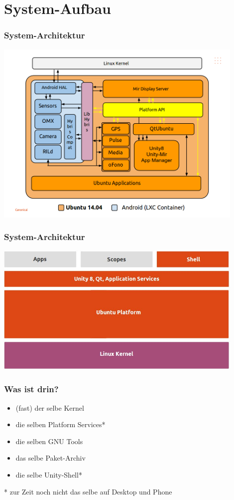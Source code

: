 \documentclass{beamer}
\begin{document}
\section{System-Aufbau}

\frame{\sectionpage}

\begin{frame}
  \frametitle{System-Architektur}
  \includegraphics[width=0.9\textwidth]{images/ubuntu_touch_architecture}
\end{frame}

\begin{frame}
  \frametitle{System-Architektur}
  \includegraphics[width=0.9\textwidth]{images/system-arch2}
\end{frame}

\begin{frame}
  \frametitle{Was ist drin?}
  \begin{itemize}
    \item (fast) der selbe Kernel
    \item die selben Platform Services*
    \item die selben GNU Tools
    \item das selbe Paket-Archiv
    \item die selbe Unity-Shell*
  \end{itemize}

  * zur Zeit noch nicht das selbe auf Desktop und Phone
\end{frame}
\end{document}
